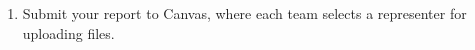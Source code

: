 \documentclass[11pt]{article}
\begin{document}
\begin{enumerate}
\item Submit your report to Canvas, where each team selects a representer for uploading files.  %


%


\end{enumerate}
\end{document}
